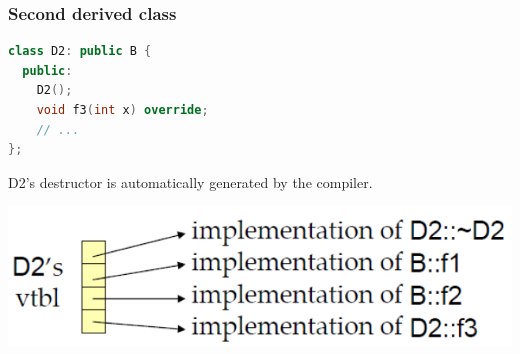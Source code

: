 \subsubsection{Second derived class}
\begin{multicols}{2}
\begin{lstlisting}[language=C++]
class D2: public B {
  public:
    D2();
    void f3(int x) override;
    // ...
};
\end{lstlisting}
\columnbreak
\vfill\null
D2's destructor is automatically generated by the compiler.\\
\begin{center}
\includegraphics[width=0.6\linewidth]{images/AdvancedCPP/vtbl3}
\end{center}
\end{multicols}

